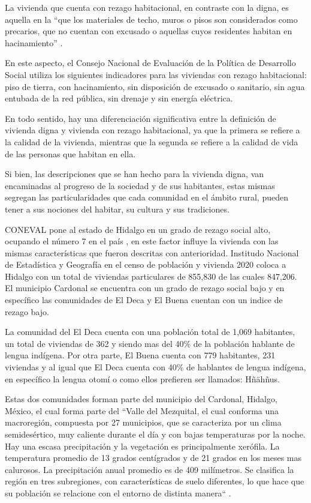 La vivienda que cuenta con rezago habitacional, en contraste con la digna, es aquella en la ``que los materiales de techo, muros o pisos son considerados como precarios, que no cuentan con excusado o aquellas cuyos residentes habitan en hacinamiento'' \cite[p. 4]{reglas2021operacion}.

En este aspecto, el Consejo Nacional de Evaluación de la Política de Desarrollo Social \citep{rezagosocial2020} utiliza los siguientes indicadores para las viviendas con rezago habitacional: piso de tierra, con hacinamiento, sin disposición de excusado o sanitario, sin agua entubada de la red pública, sin drenaje y sin energía eléctrica.

En todo sentido, hay una diferenciación significativa entre la definición de vivienda digna y vivienda con rezago habitacional, ya que la primera se refiere a la calidad de la vivienda, mientras que la segunda se refiere a la calidad de vida de las personas que habitan en ella.

Si bien, las descripciones que se han hecho para la vivienda digna, van encaminadas al progreso de la sociedad y de sus habitantes, estas mismas segregan las particularidades que cada comunidad en el ámbito rural, pueden tener a sus nociones del habitar, su cultura y sus tradiciones.

CONEVAL pone al estado de Hidalgo en un grado de rezago social alto, ocupando el número 7 en el país \citep{indice2020rezago}, en este factor influye la vivienda con las mismas características que fueron descritas con anterioridad. Institudo Nacional de Estadística y Geografía \citep{censo2020poblacion} en el censo de población y vivienda 2020 coloca a Hidalgo con un total de viviendas particulares de 855,830 de las cuales 847,206. El municipio Cardonal se encuentra con un grado de rezago social bajo y en específico las comunidades de El Deca y El Buena cuentan con un indice de rezago bajo.

La comunidad del El Deca cuenta con una población total de 1,069 habitantes, un total de viviendas de 362 y siendo mas del 40\% de la población hablante de lengua indígena. Por otra parte, El Buena cuenta con 779 habitantes, 231 viviendas y al igual que El Deca cuenta con 40\% de hablantes de lengua indígena, en específico la lengua otomí o como ellos prefieren ser llamados: Hñähñus.

Estas dos comunidades forman parte del municipio del Cardonal, Hidalgo, México, el cual forma parte del ``Valle del Mezquital, el cual conforma una macroregión, compuesta por 27 municipios, que se caracteriza por un clima semidesértico, muy caliente durante el día y con bajas temperaturas por la noche. Hay una escasa precipitación y la vegetación es principalmente xerófila. La temperatura promedio de 13 grados centígrados y de 21 grados en los meses mas calurosos. La precipitación anual promedio es de 409 milímetros. Se clasifica la región en tres subregiones, con características de suelo diferentes, lo que hace que su población se relacione con el entorno de distinta manera`` \citep[p. 56]{alvarez2003maguey}.

